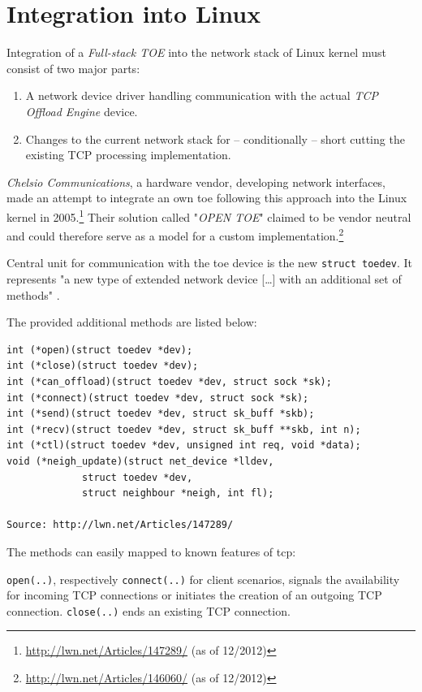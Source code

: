 \section{Integration into Linux}

Integration of a \textit{Full-stack TOE} into the network stack of Linux kernel must consist of two major parts:

\begin{enumerate}
\item A network device driver handling communication with the actual \textit{TCP Offload Engine} device.
\item Changes to the current network stack for -- conditionally -- short cutting the existing TCP processing implementation.
\end{enumerate}

\textit{Chelsio Communications}, a hardware vendor, developing network interfaces, made an attempt to integrate an own \gls{toe} following this approach into the Linux kernel in 2005.\footnote{\url{http://lwn.net/Articles/147289/} (as of 12/2012)} Their solution called "\textit{OPEN TOE}" claimed to be vendor neutral and could therefore serve as a model for a custom implementation.\footnote{\url{http://lwn.net/Articles/146060/} (as of 12/2012)}

Central unit for communication with the \gls{toe} device is the new \texttt{struct toedev}. It represents "a new type of extended network device [\dots] with an additional set of methods" \cite{linux-toe}.

The provided additional methods are listed below:

\begin{verbatim}
int (*open)(struct toedev *dev);
int (*close)(struct toedev *dev);
int (*can_offload)(struct toedev *dev, struct sock *sk);
int (*connect)(struct toedev *dev, struct sock *sk);
int (*send)(struct toedev *dev, struct sk_buff *skb);
int (*recv)(struct toedev *dev, struct sk_buff **skb, int n);
int (*ctl)(struct toedev *dev, unsigned int req, void *data);
void (*neigh_update)(struct net_device *lldev,
		     struct toedev *dev,
		     struct neighbour *neigh, int fl);

Source: http://lwn.net/Articles/147289/
\end{verbatim}

The methods can easily mapped to known features of \gls{tcp}:

\texttt{open(..)}, respectively \texttt{connect(..)} for client scenarios, signals the availability for incoming TCP connections or initiates the creation of an outgoing TCP connection. \texttt{close(..)} ends an existing TCP connection.

